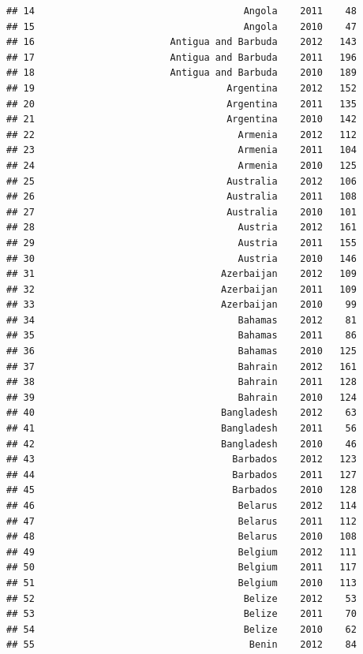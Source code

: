 \documentclass[
]{book}
\begin{document}
\begin{verbatim}
## 14                                     Angola    2011    48
## 15                                     Angola    2010    47
## 16                        Antigua and Barbuda    2012   143
## 17                        Antigua and Barbuda    2011   196
## 18                        Antigua and Barbuda    2010   189
## 19                                  Argentina    2012   152
## 20                                  Argentina    2011   135
## 21                                  Argentina    2010   142
## 22                                    Armenia    2012   112
## 23                                    Armenia    2011   104
## 24                                    Armenia    2010   125
## 25                                  Australia    2012   106
## 26                                  Australia    2011   108
## 27                                  Australia    2010   101
## 28                                    Austria    2012   161
## 29                                    Austria    2011   155
## 30                                    Austria    2010   146
## 31                                 Azerbaijan    2012   109
## 32                                 Azerbaijan    2011   109
## 33                                 Azerbaijan    2010    99
## 34                                    Bahamas    2012    81
## 35                                    Bahamas    2011    86
## 36                                    Bahamas    2010   125
## 37                                    Bahrain    2012   161
## 38                                    Bahrain    2011   128
## 39                                    Bahrain    2010   124
## 40                                 Bangladesh    2012    63
## 41                                 Bangladesh    2011    56
## 42                                 Bangladesh    2010    46
## 43                                   Barbados    2012   123
## 44                                   Barbados    2011   127
## 45                                   Barbados    2010   128
## 46                                    Belarus    2012   114
## 47                                    Belarus    2011   112
## 48                                    Belarus    2010   108
## 49                                    Belgium    2012   111
## 50                                    Belgium    2011   117
## 51                                    Belgium    2010   113
## 52                                     Belize    2012    53
## 53                                     Belize    2011    70
## 54                                     Belize    2010    62
## 55                                      Benin    2012    84

\end{verbatim}
\end{document}
